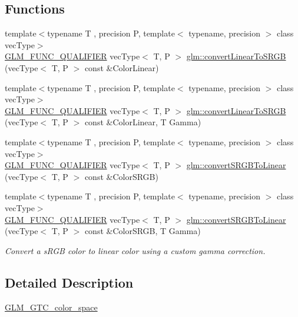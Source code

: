 \subsection*{Functions}
\begin{DoxyCompactItemize}
\item 
{\footnotesize template$<$typename T , precision P, template$<$ typename, precision $>$ class vec\+Type$>$ }\\\mbox{\hyperlink{setup_8hpp_a33fdea6f91c5f834105f7415e2a64407}{G\+L\+M\+\_\+\+F\+U\+N\+C\+\_\+\+Q\+U\+A\+L\+I\+F\+I\+ER}} vec\+Type$<$ T, P $>$ \mbox{\hyperlink{group__gtc__color__space_gad813dcd99644cafc775e83d6504ccb93}{glm\+::convert\+Linear\+To\+S\+R\+GB}} (vec\+Type$<$ T, P $>$ const \&Color\+Linear)
\item 
{\footnotesize template$<$typename T , precision P, template$<$ typename, precision $>$ class vec\+Type$>$ }\\\mbox{\hyperlink{setup_8hpp_a33fdea6f91c5f834105f7415e2a64407}{G\+L\+M\+\_\+\+F\+U\+N\+C\+\_\+\+Q\+U\+A\+L\+I\+F\+I\+ER}} vec\+Type$<$ T, P $>$ \mbox{\hyperlink{group__gtc__color__space_ga63f8b003da7acf44370eb47bfb8b3d42}{glm\+::convert\+Linear\+To\+S\+R\+GB}} (vec\+Type$<$ T, P $>$ const \&Color\+Linear, T Gamma)
\item 
{\footnotesize template$<$typename T , precision P, template$<$ typename, precision $>$ class vec\+Type$>$ }\\\mbox{\hyperlink{setup_8hpp_a33fdea6f91c5f834105f7415e2a64407}{G\+L\+M\+\_\+\+F\+U\+N\+C\+\_\+\+Q\+U\+A\+L\+I\+F\+I\+ER}} vec\+Type$<$ T, P $>$ \mbox{\hyperlink{group__gtc__color__space_ga28e98e64347cf385cadc1ceb4def55c9}{glm\+::convert\+S\+R\+G\+B\+To\+Linear}} (vec\+Type$<$ T, P $>$ const \&Color\+S\+R\+GB)
\item 
{\footnotesize template$<$typename T , precision P, template$<$ typename, precision $>$ class vec\+Type$>$ }\\\mbox{\hyperlink{setup_8hpp_a33fdea6f91c5f834105f7415e2a64407}{G\+L\+M\+\_\+\+F\+U\+N\+C\+\_\+\+Q\+U\+A\+L\+I\+F\+I\+ER}} vec\+Type$<$ T, P $>$ \mbox{\hyperlink{group__gtc__color__space_ga61c4f0efdf55c29d9cfbd26141fddef8}{glm\+::convert\+S\+R\+G\+B\+To\+Linear}} (vec\+Type$<$ T, P $>$ const \&Color\+S\+R\+GB, T Gamma)
\begin{DoxyCompactList}\small\item\em Convert a s\+R\+GB color to linear color using a custom gamma correction. \end{DoxyCompactList}\end{DoxyCompactItemize}


\subsection{Detailed Description}
\mbox{\hyperlink{group__gtc__color__space}{G\+L\+M\+\_\+\+G\+T\+C\+\_\+color\+\_\+space}} 